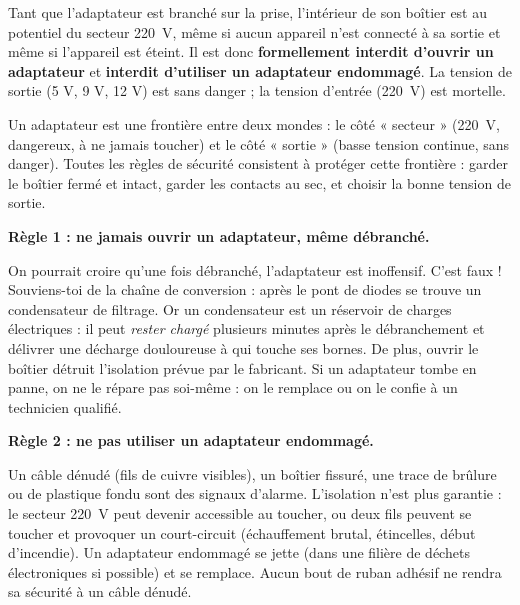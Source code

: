 \documentclass[11pt]{article}
\newcommand{\cle}[1]{{\popxbold\color{popdark}#1}}
\newcounter{popsec}
\newcounter{popsub}
\newcommand{\courssub}[1]{%
  \stepcounter{popsub}%
  \par\vspace{9pt}\noindent{\popxbold\fontsize{11.5}{13}\selectfont\color{popink}{\color{poporange}\thepopsec.\thepopsub}\hspace{6pt}#1}\par\nopagebreak\vspace{4pt}
}
\begin{document}
\begin{attention}
Tant que l'adaptateur est branché sur la prise, l'intérieur de son boîtier est au potentiel du secteur \SI{220}{V}, même si aucun appareil n'est connecté à sa sortie et même si l'appareil est éteint. Il est donc \textbf{formellement interdit d'ouvrir un adaptateur} et \textbf{interdit d'utiliser un adaptateur endommagé}. La tension de sortie (5 V, 9 V, 12 V) est sans danger ; la tension d'entrée (\SI{220}{V}) est mortelle.
\end{attention}

\begin{aretenir}
Un adaptateur est une frontière entre deux mondes : le côté « secteur » (\SI{220}{V}, dangereux, à ne jamais toucher) et le côté « sortie » (basse tension continue, sans danger). Toutes les règles de sécurité consistent à protéger cette frontière : garder le boîtier fermé et intact, garder les contacts au sec, et choisir la bonne tension de sortie.
\end{aretenir}

\courssub{Les six règles d'or}

\textbf{Règle 1 : ne jamais ouvrir un adaptateur, même débranché.}\par
On pourrait croire qu'une fois débranché, l'adaptateur est inoffensif. C'est faux ! Souviens-toi de la chaîne de conversion : après le pont de diodes se trouve un \cle{condensateur} de filtrage. Or un condensateur est un réservoir de charges électriques : il peut \emph{rester chargé} plusieurs minutes après le débranchement et délivrer une décharge douloureuse à qui touche ses bornes. De plus, ouvrir le boîtier détruit l'isolation prévue par le fabricant. Si un adaptateur tombe en panne, on ne le répare pas soi-même : on le remplace ou on le confie à un technicien qualifié.

\textbf{Règle 2 : ne pas utiliser un adaptateur endommagé.}\par
Un câble dénudé (fils de cuivre visibles), un boîtier fissuré, une trace de brûlure ou de plastique fondu sont des signaux d'alarme. L'isolation n'est plus garantie : le secteur \SI{220}{V} peut devenir accessible au toucher, ou deux fils peuvent se toucher et provoquer un \cle{court-circuit} (échauffement brutal, étincelles, début d'incendie). Un adaptateur endommagé se jette (dans une filière de déchets électroniques si possible) et se remplace. Aucun bout de ruban adhésif ne rendra sa sécurité à un câble dénudé.
\end{document}
